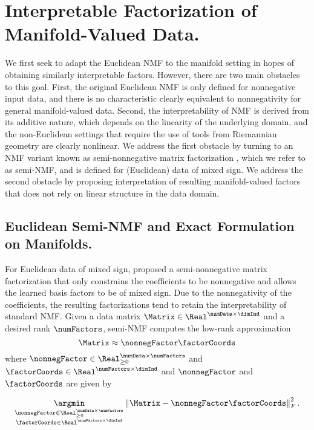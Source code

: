 \section{Interpretable Factorization of Manifold-Valued Data.}
\label{sec:factorization}
We first seek to adapt the Euclidean NMF to the manifold setting in hopes of obtaining similarly interpretable factors. However, there are two main obstacles to this goal. First, the original Euclidean NMF is only defined for nonnegative input data, and there is no characteristic clearly equivalent to nonnegativity for general manifold-valued data. Second, the interpretability of NMF is derived from its additive nature, which depends on the linearity of the underlying domain, and the non-Euclidean settings that require the use of tools from Riemannian geometry are clearly nonlinear. We address the first obstacle by turning to an NMF variant known as semi-nonnegative matrix factorization \citep{ding2008convex}, which we refer to as semi-NMF, and is defined for (Euclidean) data of mixed sign. We address the second obstacle by proposing interpretation of resulting manifold-valued factors that does not rely on linear structure in the data domain. 
\subsection{Euclidean Semi-NMF and Exact Formulation on Manifolds.}
For Euclidean data of mixed sign, \cite{ding2008convex} proposed a semi-nonnegative matrix factorization that only constrains the coefficients to be nonnegative and allows the learned basis factors to be of mixed sign. Due to the nonnegativity of the coefficients, the resulting factorizations tend to retain the interpretability of standard NMF. Given a data matrix $\Matrix \in \Real^{\numData \times \dimInd}$ and a desired rank $\numFactors$, semi-NMF computes the low-rank approximation
\begin{equation}
\label{eq:eucl SNMF}
    \Matrix \approx \nonnegFactor \factorCoords
\end{equation}
where $\nonnegFactor \in \Real_{\geq 0}^{\numData \times \numFactors}$ and $\factorCoords\in\Real^{\numFactors \times \dimInd}$ and $\nonnegFactor$ and $\factorCoords$ are given by

\begin{equation}
\label{eq:eucl SNMF opt prob}
\underset{\substack{\nonnegFactor \in \Real_{\geq 0}^{\numData \times \numFactors}\\ \factorCoords\in\Real^{\numFactors \times \dimInd}}}{\argmin} \left\|\Matrix - \nonnegFactor \factorCoords\right\|_F^2.
\end{equation}

